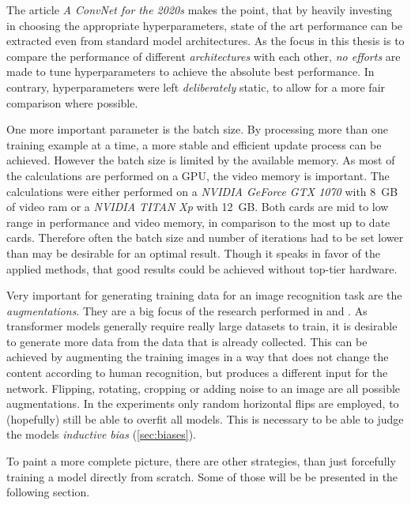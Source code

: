 The article \emph{A ConvNet for the 2020s} \cite{convNetForThe2020s} makes the point, that by heavily investing in choosing the appropriate hyperparameters, state of the art performance can be extracted even from \glqq standard\grqq{} model architectures. 
As the focus in this thesis is to compare the performance of different \emph{architectures} with each other, \emph{no efforts} are made to tune hyperparameters to achieve the absolute best performance. 
In contrary, hyperparameters were left \emph{deliberately} static, to allow for a more fair comparison where possible.

One more important parameter is the batch size. 
By processing more than one training example at a time, a more stable and efficient update process can be achieved.
However the batch size is limited by the available memory. 
As most of the calculations are performed on a GPU, the video memory is important. 
The calculations were either performed on a \emph{NVIDIA GeForce GTX 1070} with \SI[]{8}[]{GB} of video ram or a \emph{NVIDIA TITAN Xp} with \SI[]{12}[]{GB}. 
Both cards are mid to low range in performance and video memory, in comparison to the most up to date cards. 
Therefore often the batch size and number of iterations had to be set lower than may be desirable for an optimal result. Though it speaks in favor of the applied methods, that good results could be achieved without top-tier hardware.

Very important for generating training data for an image recognition task are the \emph{augmentations}. 
They are a big focus of the research performed in \cite{convNetForThe2020s} and \cite{dinoPaper}.
As transformer models generally require really large datasets to train, it is desirable to generate more data from the data that is already collected. 
This can be achieved by augmenting the training images in a way that does not change the content according to human recognition, but produces a different input for the network.
Flipping, rotating, cropping or adding noise to an image are all possible augmentations. 
In the experiments only random horizontal flips are employed, to (hopefully) still be able to overfit all models. 
This is necessary to be able to judge the models \emph{inductive bias} (\autoref{sec:biases}).

To paint a more complete picture, there are other strategies, than just forcefully training a model directly from scratch. 
Some of those will be be presented in the following section.